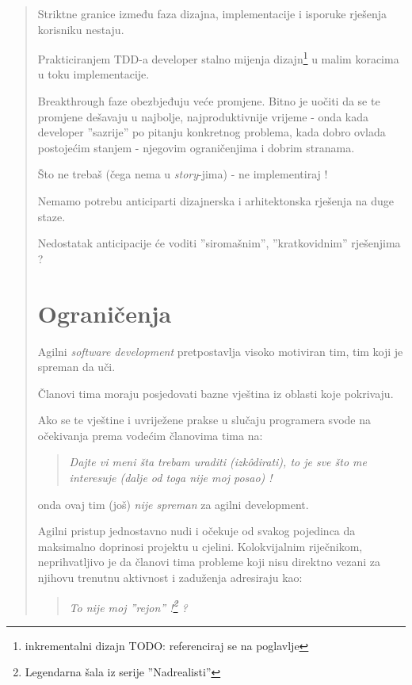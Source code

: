\documentclass[lmodern, utf8, zavrsni]{fit}
\begin{document}
\begin{quote}
Striktne granice između faza dizajna, implementacije i isporuke rješenja korisniku nestaju.

Prakticiranjem TDD-a developer stalno mijenja dizajn\footnote{inkrementalni dizajn TODO: referenciraj se na poglavlje} u malim koracima u toku implementacije.

Breakthrough faze obezbjeđuju veće promjene. Bitno je uočiti da se te promjene dešavaju u najbolje, najproduktivnije vrijeme - onda kada developer ''sazrije'' po pitanju konkretnog problema, kada dobro ovlada postojećim stanjem - njegovim ograničenjima i dobrim stranama.

Što ne trebaš (čega nema u \emph{story}-jima) - ne implementiraj !

Nemamo potrebu anticiparti dizajnerska i arhitektonska rješenja na duge staze.

Nedostatak anticipacije će voditi ''siromašnim'', ''kratkovidnim'' rješenjima ?

{\color{red}{::ODGOVORITI, ELABORIRRATI::}}


\chapter{Ograničenja}

Agilni \emph{software development} pretpostavlja visoko motiviran tim, tim koji je spreman da uči. 

Članovi tima moraju posjedovati bazne vještina iz oblasti koje pokrivaju.

Ako se te vještine i uvriježene prakse u slučaju programera svode na očekivanja prema vodećim članovima tima na:

\begin{quotation}
  \emph{Dajte vi meni šta trebam uraditi (izk\^odirati), to je sve što me interesuje (dalje od toga nije moj posao) !}
\end{quotation}

onda ovaj tim (još) \emph{nije spreman} za agilni development.

Agilni pristup jednostavno nudi i očekuje od svakog pojedinca da maksimalno doprinosi projektu u cjelini. Kolokvijalnim riječnikom, neprihvatljivo je da članovi tima probleme koji nisu direktno vezani za njihovu trenutnu aktivnost i zaduženja adresiraju kao:

\begin{quotation}
  \emph{To nije moj ''rejon'' !\footnote{Legendarna šala iz serije ''Nadrealisti''} ?}
\end{quotation}


\end{quote}
\end{document}
